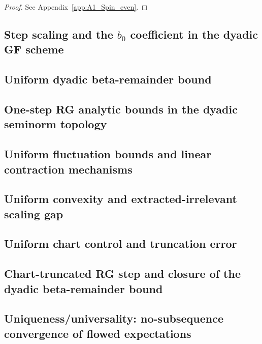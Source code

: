 \begin{proof}
See Appendix~\ref{app:A1_Spin_even}.
\end{proof}

\subsection{Step scaling and the \texorpdfstring{$b_0$}{b0} coefficient in the dyadic GF scheme}
\label{subsec:step_scaling}


\subsection{Uniform dyadic beta-remainder bound}


\subsection{One-step RG analytic bounds in the dyadic seminorm topology}


\subsection{Uniform fluctuation bounds and linear contraction mechanisms}


\subsection{Uniform convexity and extracted-irrelevant scaling gap}


\subsection{Uniform chart control and truncation error}


\subsection{Chart-truncated RG step and closure of the dyadic beta-remainder bound}


\subsection{Uniqueness/universality: no-subsequence convergence of flowed expectations}




